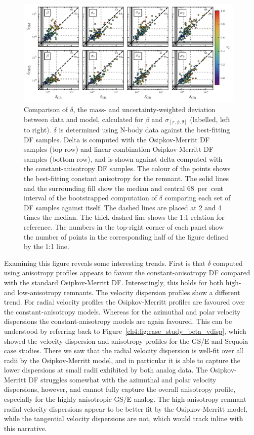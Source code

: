 \begin{figure}
    \centering
    \includegraphics[width=\textwidth]{figure/ch4/delta_comparison.pdf}
    \caption{Comparison of $\delta$, the mass- and uncertainty-weighted deviation between data and model, calculated for $\beta$ and $\sigma_{[r,\phi,\theta]}$ (labelled, left to right). $\delta$ is determined using N-body data against the best-fitting DF samples. Delta is computed with the Osipkov-Merritt DF samples (top row) and linear combination Osipkov-Merritt DF samples (bottom row), and is shown against delta computed with the constant-anisotropy DF samples. The colour of the points shows the best-fitting constant anisotropy for the remnant. The solid lines and the surrounding fill show the median and central 68~per~cent interval of the bootstrapped computation of $\delta$ comparing each set of DF samples against itself. The dashed lines are placed at 2 and 4 times the median. The thick dashed line shows the 1:1 relation for reference. The numbers in the top-right corner of each panel show the number of points in the corresponding half of the figure defined by the 1:1 line.}
    \label{ch4:fig:delta-comparison}
\end{figure}

Examining this figure reveals some interesting trends. First is that $\delta$ computed using anisotropy profiles appears to favour the constant-anisotropy DF compared with the standard Osipkov-Merritt DF. Interestingly, this holds for both high- and low-anisotropy remnants. The velocity dispersion profiles show a different trend. For radial velocity profiles the Osipkov-Merritt profiles are favoured over the constant-anisotropy models. Whereas for the azimuthal and polar velocity dispersions the constant-anisotropy models are again favoured. This can be understood by referring back to Figure~\ref{ch4:fig:case_study_beta_vdisp}, which showed the velocity dispersion and anisotropy profiles for the GS/E and Sequoia case studies. There we saw that the radial velocity dispersion is well-fit over all radii by the Osipkov-Merritt model, and in particular it is able to capture the lower dispersions at small radii exhibited by both analog data. The Osipkov-Merritt DF struggles somewhat with the azimuthal and polar velocity dispersions, however, and cannot fully capture the overall anisotropy profile, especially for the highly anisotropic GS/E analog. The high-anisotropy remnant radial velocity dispersions appear to be better fit by the Osipkov-Merritt model, while the tangential velocity dispersions are not, which would track inline with this narrative.

